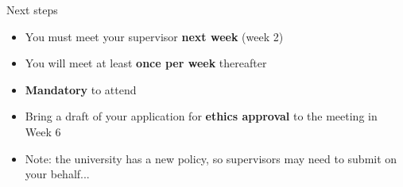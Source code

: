 \begin{frame}{Next steps}
	\begin{itemize}
		\pause\item You must meet your supervisor \textbf{next week} (week 2)
		\pause\item You will meet at least \textbf{once per week} thereafter
		\pause\item \textbf{Mandatory} to attend
		\pause\item Bring a draft of your application for \textbf{ethics approval} to the meeting in Week 6
		\pause\item Note: the university has a new policy, so supervisors may need to submit on your behalf...
	\end{itemize}
\end{frame}
